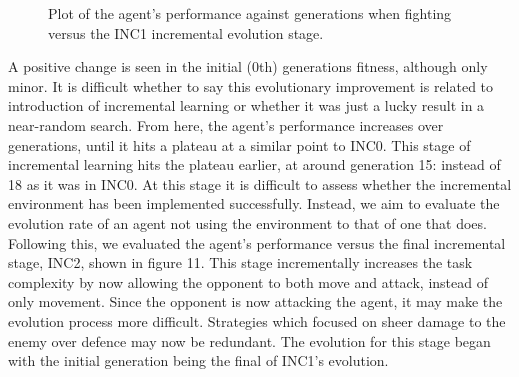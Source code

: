 \documentclass[12pt,a4paper]{article}
\begin{document}
\begin{figure}[h]
\begin{center}
\caption{Plot of the agent's performance against generations when fighting versus the INC1 incremental evolution stage.}
\end{center}
\end{figure}
\newpage
A positive change is seen in the initial (0th) generations fitness, although only minor. It is difficult whether to say this evolutionary improvement is related to introduction of incremental learning or whether it was just a lucky result in a near-random search. From here, the agent's performance increases over generations, until it hits a plateau at a similar point to INC0. This stage of incremental learning hits the plateau earlier, at around generation 15: instead of 18 as it was in INC0. At this stage it is difficult to assess whether the incremental environment has been implemented successfully. Instead, we aim to evaluate the evolution rate of an agent not using the environment to that of one that does.\\ 

Following this, we evaluated the agent's performance versus the final incremental stage, INC2, shown in figure 11. This stage incrementally increases the task complexity by now allowing the opponent to both move and attack, instead of only movement. Since the opponent is now attacking the agent, it may make the evolution process more difficult. Strategies which focused on sheer damage to the enemy over defence may now be redundant. The evolution for this stage began with the initial generation being the final of INC1's evolution.\\
\end{document}

